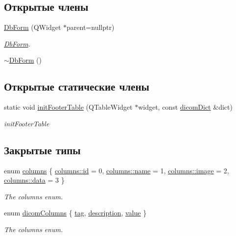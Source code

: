 \subsection*{Открытые члены}
\begin{DoxyCompactItemize}
\item 
\hyperlink{classDbForm_a66426b83490cb4c054905c12dc6a220e}{Db\+Form} (Q\+Widget $\ast$parent=nullptr)
\begin{DoxyCompactList}\small\item\em \hyperlink{classDbForm}{Db\+Form}. \end{DoxyCompactList}\item 
\hyperlink{classDbForm_abbdba78f6818adfd9fc156b3246bb788}{$\sim$\+Db\+Form} ()
\end{DoxyCompactItemize}
\subsection*{Открытые статические члены}
\begin{DoxyCompactItemize}
\item 
static void \hyperlink{classDbForm_a3877cc6e7b607e2999da50b5322615d4}{init\+Footer\+Table} (Q\+Table\+Widget $\ast$widget, const \hyperlink{tagshelpers_8h_ae25d30658f61420b88a380dc9e40bb74}{dicom\+Dict} \&dict)
\begin{DoxyCompactList}\small\item\em init\+Footer\+Table \end{DoxyCompactList}\end{DoxyCompactItemize}
\subsection*{Закрытые типы}
\begin{DoxyCompactItemize}
\item 
enum \hyperlink{classDbForm_a86764414aea9eeb51e9cdfa722447b93}{columns} \{ \hyperlink{classDbForm_a86764414aea9eeb51e9cdfa722447b93ab80bb7740288fda1f201890375a60c8f}{columns\+::id} = 0, 
\hyperlink{classDbForm_a86764414aea9eeb51e9cdfa722447b93ab068931cc450442b63f5b3d276ea4297}{columns\+::name} = 1, 
\hyperlink{classDbForm_a86764414aea9eeb51e9cdfa722447b93a78805a221a988e79ef3f42d7c5bfd418}{columns\+::image} = 2, 
\hyperlink{classDbForm_a86764414aea9eeb51e9cdfa722447b93a8d777f385d3dfec8815d20f7496026dc}{columns\+::data} = 3
 \}\begin{DoxyCompactList}\small\item\em The columns enum. \end{DoxyCompactList}
\item 
enum \hyperlink{classDbForm_a3c4b02b0603d0d9cd8c22ed0214d55fd}{dicom\+Columns} \{ \hyperlink{classDbForm_a3c4b02b0603d0d9cd8c22ed0214d55fdac49e86041d3f004eeaaff68fb53cd961}{tag}, 
\hyperlink{classDbForm_a3c4b02b0603d0d9cd8c22ed0214d55fdade3e2648868259c386f105866f10211b}{description}, 
\hyperlink{classDbForm_a3c4b02b0603d0d9cd8c22ed0214d55fda545ec36d06133ca13ccb0780da8184e9}{value}
 \}\begin{DoxyCompactList}\small\item\em The columns enum. \end{DoxyCompactList}
\end{DoxyCompactItemize}
